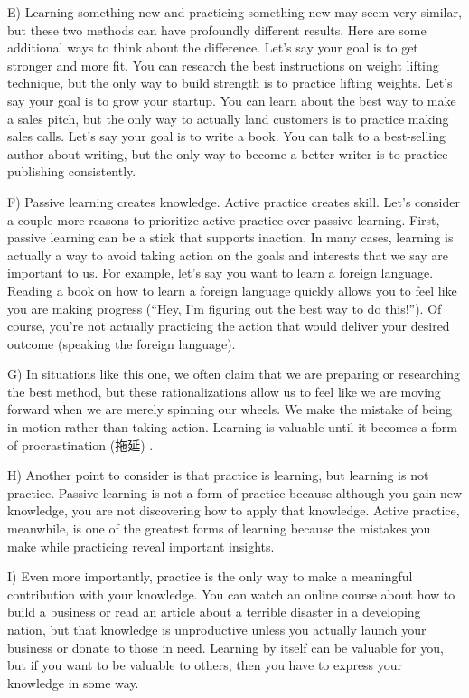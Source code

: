 \documentclass[UTF8,11pt]{ctexart}
\begin{document}
E) Learning something new and practicing something new may seem very similar, but these two methods can have profoundly different results. Here are some additional ways to think about the difference. Let’s say your goal is to get stronger and more fit. You can research the best instructions on weight lifting technique, but the only way to build strength is to practice lifting weights. Let’s say your goal is to grow your startup. You can learn about the best way to make a sales pitch, but the only way to actually land customers is to practice making sales calls. Let’s say your goal is to write a book. You can talk to a best-selling author about writing, but the only way to become a better writer is to practice publishing consistently.


F) Passive learning creates knowledge. Active practice creates skill. Let’s consider a couple more reasons to prioritize active practice over passive learning. First, passive learning can be a stick that supports inaction. In many cases, learning is actually a way to avoid taking action on the goals and interests that we say are important to us. For example, let’s say you want to learn a foreign language. Reading a book on how to learn a foreign language quickly allows you to feel like you are making progress (“Hey, I’m figuring out the best way to do this!”). Of course, you’re not actually practicing the action that would deliver your desired outcome (speaking the foreign language).


G) In situations like this one, we often claim that we are preparing or researching the best method, but these rationalizations allow us to feel like we are moving forward when we are merely spinning our wheels. We make the mistake of being in motion rather than taking action. Learning is valuable until it becomes a form of procrastination (拖延) .


H) Another point to consider is that practice is learning, but learning is not practice. Passive learning is not a form of practice because although you gain new knowledge, you are not discovering how to apply that knowledge. Active practice, meanwhile, is one of the greatest forms of learning because the mistakes you make while practicing reveal important insights.


I) Even more importantly, practice is the only way to make a meaningful contribution with your knowledge. You can watch an online course about how to build a business or read an article about a terrible disaster in a developing nation, but that knowledge is unproductive unless you actually launch your business or donate to those in need. Learning by itself can be valuable for you, but if you want to be valuable to others, then you have to express your knowledge in some way.
\end{document}
